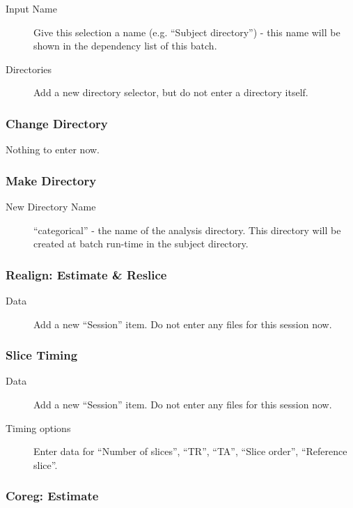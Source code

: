 \documentclass[a4paper]{book}
\begin{document}
\begin{description}
\item[Input Name] Give this selection a name (e.g. ``Subject directory'') -
  this name will be shown in the dependency list of this batch.
\item[Directories] Add a new directory selector, but do not enter a
  directory itself.
\end{description}

\subsubsection*{Change Directory} 

Nothing to enter now.

\subsubsection*{Make Directory}

\begin{description}
\item[New Directory Name] ``categorical'' - the name of the analysis
  directory. This directory will be created at batch run-time in the subject
  directory. 
\end{description}

\subsubsection*{Realign: Estimate \& Reslice}

\begin{description}
\item[Data] Add a new ``Session'' item. Do not enter any files for this
  session now.
\end{description}

\subsubsection*{Slice Timing}

\begin{description}
\item[Data] Add a new ``Session'' item. Do not enter any files for this
  session now.
\item[Timing options] Enter data for ``Number of slices'', ``TR'', ``TA'',
  ``Slice order'', ``Reference slice''.
\end{description}

\subsubsection*{Coreg: Estimate} 
\end{document}

